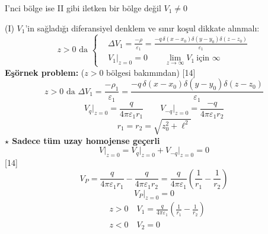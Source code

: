 \documentclass[11pt,a4paper]{article}
\begin{document}
I'nci bölge ise II gibi iletken bir bölge değil $V_1\neq0$

(I) $V_1$'in sağladığı diferansiyel denklem ve sınır koşul dikkate alınmalı:
\[ z>0\text{ da }\left\{\begin{aligned}&\Delta V_1=\frac{-\rho}{\varepsilon_1}=\frac{-q\,\delta(x-x_0)\delta(y-y_0)\delta(z-z_0)}{\varepsilon_1}\\&V_1\Big|_{z=0}=0\qquad\lim_{z\to\infty}V_1\ \text{için }\infty\end{aligned}\right. \]
\textbf{Eşörnek problem:} ($z>0$ bölgesi bakımından)
[14]
\[ z>0\text{ da }\Delta V_1=\frac{-\rho_1}{\varepsilon_1}=\frac{-q\,\delta(x-x_0)\delta(y-y_0)\delta(z-z_0)}{\varepsilon_1} \]
\[ V_q\Big|_{z=0}=\frac{q}{4\pi\varepsilon_1r_1}\qquad V_{-q}\Big|_{z=0}=\frac{-q}{4\pi\varepsilon_1r_2} \]
\[ r_1=r_2=\sqrt{z_0^2+\ell^2} \]
\textbf{$\star$ Sadece tüm uzay homojense  geçerli}
\[ V\Big|_{z=0}=V_q\Big|_{z=0}+V_{-q}\Big|_{z=0}=0 \]
[14]
\[ V_P=\frac{q}{4\pi\varepsilon_1r_1}-\frac{q}{4\pi\varepsilon_1r_2}=\frac{q}{4\pi\varepsilon_1}\left(\frac1{r_1}-\frac1{r_2}\right) \]
\[ V_P\Big|_{z=0}=0 \]
\begin{align*}
&z>0\quad V_1=\frac{q}{4\pi\varepsilon_1}\left(\frac1{r_1}-\frac1{r_2}\right)\\
&z<0\quad V_2=0
\end{align*}
\end{document}
